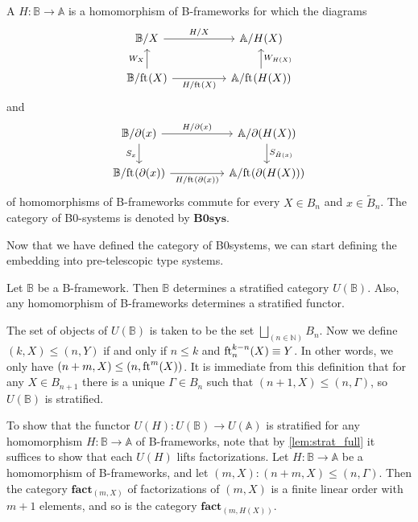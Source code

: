 \begin{defn}
A  $H:\mathbb{B}\to\mathbb{A}$ is a homomorphism of B-frameworks
for which the diagrams
\begin{equation*}
\begin{tikzcd}[column sep=huge]
\mathbb{B}/X \arrow[r,"H/X"] & \mathbb{A}/H(X) \\
\mathbb{B}/\eft(X) \arrow[u,"W_X"] \arrow[r,swap,"H/\eft(X)"] & \mathbb{A}/\eft(H(X)) \arrow[u,swap,"W_{H(X)}"]
\end{tikzcd}
\end{equation*}
and
\begin{equation*}
\begin{tikzcd}[column sep=huge]
\mathbb{B}/\ebd(x) \arrow[r,"H/\ebd(x)"] \arrow[d,swap,"S_x"] & \mathbb{A}/\ebd(H(X)) \arrow[d,"S_{\tilde{H}(x)}"] \\
\mathbb{B}/\eft(\ebd(x)) \arrow[r,swap,"H/\eft(\ebd(x))"] & \mathbb{A}/\eft(\ebd(H(X)))
\end{tikzcd}
\end{equation*}
of homomorphisms of B-frameworks commute for every 
$X\in B_n$ and $x\in\tilde{B}_n$. The category of B0-systems is denoted
by $\mathbf{B0sys}$.
\end{defn}

Now that we have defined the category of B0systems, we can start defining the
embedding into pre-telescopic type systems.

\begin{defn}
Let $\mathbb{B}$ be a B-framework. Then $\mathbb{B}$ determines
a stratified category $U(\mathbb{B})$. Also, any homomorphism of B-frameworks
determines a stratified functor.
\end{defn}

\begin{constr}
The set of objects of $U(\mathbb{B})$ is taken to be the set
$\bigsqcup_{(n\in\mathbb{N})}B_n$. Now we define
$(k,X)\leq (n,Y)$ if and only if $n\leq k$ and $\eft[n]^{k-n}(X)\jdeq Y$.
In other words, we only have $(n+m,X)\leq (n,\eft^m(X))$. It is immediate from
this definition that for any $X\in B_{n+1}$ there is a unique $\Gamma\in
B_n$ such that $(n+1,X)\leq (n,\Gamma)$, so $U(\mathbb{B})$ is stratified.

To show that the functor $U(H):U(\mathbb{B})\to U(\mathbb{A})$ is stratified for
any homomorphism $H:\mathbb{B}\to\mathbb{A}$ of B-frameworks, note that
by \autoref{lem:strat_full} it suffices to show that each $U(H)$ 
lifts factorizations.
Let $H:\mathbb{B}\to\mathbb{A}$ be a homomorphism of B-frameworks, and let
$(m,X):(n+m,X)\leq (n,\Gamma)$. Then the category $\mathbf{fact}_{(m,X)}$ of
factorizations of $(m,X)$ is a finite linear order with
$m+1$ elements, and so is the category $\mathbf{fact}_{(m,H(X))}$. 
\end{constr}

